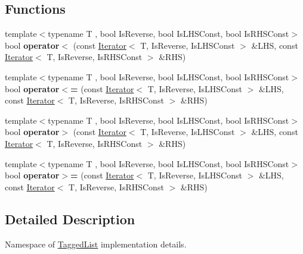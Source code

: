 \subsection*{Functions}
\begin{DoxyCompactItemize}
\item 
\mbox{\label{namespaceglow_1_1tagged__list__details_a4c809e6f2f2e36966b1e2d5d746cec43}} 
{\footnotesize template$<$typename T , bool Is\+Reverse, bool Is\+L\+H\+S\+Const, bool Is\+R\+H\+S\+Const$>$ }\\bool {\bfseries operator$<$} (const \hyperlink{classglow_1_1tagged__list__details_1_1_iterator}{Iterator}$<$ T, Is\+Reverse, Is\+L\+H\+S\+Const $>$ \&L\+HS, const \hyperlink{classglow_1_1tagged__list__details_1_1_iterator}{Iterator}$<$ T, Is\+Reverse, Is\+R\+H\+S\+Const $>$ \&R\+HS)
\item 
\mbox{\label{namespaceglow_1_1tagged__list__details_acf0cbe11c60b3a9bf1da7aa417bd233c}} 
{\footnotesize template$<$typename T , bool Is\+Reverse, bool Is\+L\+H\+S\+Const, bool Is\+R\+H\+S\+Const$>$ }\\bool {\bfseries operator$<$=} (const \hyperlink{classglow_1_1tagged__list__details_1_1_iterator}{Iterator}$<$ T, Is\+Reverse, Is\+L\+H\+S\+Const $>$ \&L\+HS, const \hyperlink{classglow_1_1tagged__list__details_1_1_iterator}{Iterator}$<$ T, Is\+Reverse, Is\+R\+H\+S\+Const $>$ \&R\+HS)
\item 
\mbox{\label{namespaceglow_1_1tagged__list__details_ad7f297b044310c92845d2b1cc6d8f809}} 
{\footnotesize template$<$typename T , bool Is\+Reverse, bool Is\+L\+H\+S\+Const, bool Is\+R\+H\+S\+Const$>$ }\\bool {\bfseries operator$>$} (const \hyperlink{classglow_1_1tagged__list__details_1_1_iterator}{Iterator}$<$ T, Is\+Reverse, Is\+L\+H\+S\+Const $>$ \&L\+HS, const \hyperlink{classglow_1_1tagged__list__details_1_1_iterator}{Iterator}$<$ T, Is\+Reverse, Is\+R\+H\+S\+Const $>$ \&R\+HS)
\item 
\mbox{\label{namespaceglow_1_1tagged__list__details_aa3a84f6d9e12d142eb0c0908b7fa9632}} 
{\footnotesize template$<$typename T , bool Is\+Reverse, bool Is\+L\+H\+S\+Const, bool Is\+R\+H\+S\+Const$>$ }\\bool {\bfseries operator$>$=} (const \hyperlink{classglow_1_1tagged__list__details_1_1_iterator}{Iterator}$<$ T, Is\+Reverse, Is\+L\+H\+S\+Const $>$ \&L\+HS, const \hyperlink{classglow_1_1tagged__list__details_1_1_iterator}{Iterator}$<$ T, Is\+Reverse, Is\+R\+H\+S\+Const $>$ \&R\+HS)
\end{DoxyCompactItemize}


\subsection{Detailed Description}
Namespace of \hyperlink{classglow_1_1_tagged_list}{Tagged\+List} implementation details. 